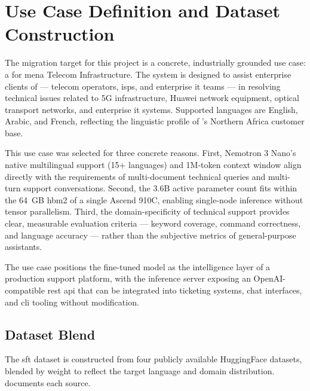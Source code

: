 
\section{Use Case Definition and Dataset Construction}
\label{sec:usecase-dataset}


The migration target for this project is a concrete, industrially
grounded use case: a 
for \acrshort{mena} Telecom Infrastructure. The system is designed
to assist enterprise clients of \CompanyName{} — telecom operators,
\acrshort{isp}s, and enterprise \acrshort{it} teams — in resolving
technical issues related to 5G infrastructure, Huawei network
equipment, optical transport networks, and enterprise \acrshort{it}
systems. Supported languages are English, Arabic, and French,
reflecting the linguistic profile of \CompanyName{}'s Northern Africa
customer base.

This use case was selected for three concrete reasons. First, Nemotron
3 Nano's native multilingual support (15+ languages) and 1M-token
context window align directly with the requirements of multi-document
technical queries and multi-turn support conversations. Second, the
3.6B active parameter count fits within the 64~GB \acrshort{hbm2}
of a single Ascend 910C, enabling single-node inference without
tensor parallelism. Third, the domain-specificity of technical support
provides clear, measurable evaluation criteria — keyword coverage,
command correctness, and language accuracy — rather than the
subjective metrics of general-purpose assistants.

The use case positions the fine-tuned model as the intelligence layer
of a production support platform, with the inference server exposing
an OpenAI-compatible \acrshort{rest} \acrshort{api} that can be
integrated into ticketing systems, chat interfaces, and
\acrshort{cli} tooling without modification.

\subsection{Dataset Blend}
\label{subsec:dataset}

The \acrshort{sft} dataset is constructed from four publicly
available HuggingFace datasets, blended by weight to reflect the
target language and domain distribution. 
documents each source.

